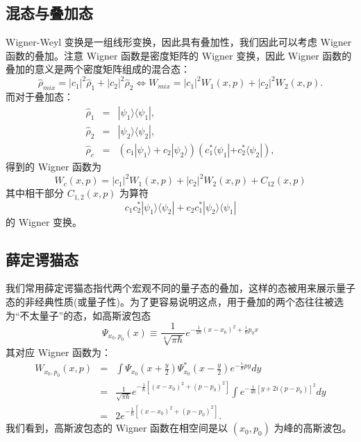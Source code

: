 \documentclass[10pt,UTF8]{ctexart}
\begin{document}
\subsection*{混态与叠加态}
\noindent
Wigner-Weyl 变换是一组线形变换，因此具有叠加性，我们因此可以考虑 Wigner 函数的叠加。注意 Wigner 函数是密度矩阵的 Wigner 变换，因此 Wigner 函数的叠加的意义是两个密度矩阵组成的混合态：
\begin{equation}
	\hat{\rho}_{mix} = |c_1|^2 \hat \rho_1 + |c_2|^2 \hat \rho_2 \Longleftrightarrow W_{mix} = |c_1|^2 W_1(x,p) + |c_2|^2 W_2(x,p).
\end{equation}
而对于叠加态：
\begin{eqnarray}
	\hat \rho_1 &=& |\psi_1\rangle \langle \psi_1|, \\
	\hat \rho_2 &=& |\psi_2\rangle \langle \psi_2|, \\
	\hat \rho_c &=& (c_1|\psi_1\rangle + c_2 |\psi_2\rangle) (c_1^*\langle \psi_1| + c_2^* \langle \psi_2|),
\end{eqnarray}
得到的 Wigner 函数为
\begin{equation}
	W_c(x,p) = |c_1|^2 W_1(x,p) + |c_2|^2 W_2(x,p) + C_{12}(x,p)
\end{equation}
其中相干部分 $C_{1,2}(x,p)$ 为算符
\begin{equation}
	c_1c_2^* |\psi_1 \rangle \langle \psi_2 | + c_2c_1^* |\psi_2 \rangle \langle \psi_1 |
\end{equation}
的 Wigner 变换。


\subsection*{薛定谔猫态}
\noindent
我们常用薛定谔猫态指代两个宏观不同的量子态的叠加，这样的态被用来展示量子态的非经典性质(或量子性)。为了更容易说明这点，用于叠加的两个态往往被选为“不太量子”的态，如高斯波包态
\begin{equation}
	\Psi_{x_0,p_0}(x) \equiv \frac{1}{\sqrt[4]{\pi \hbar}}e^{-\frac{1}{2 \hbar} (x-x_0)^2+\frac{i}{\hbar}p_0 x}
\end{equation}
其对应 Wigner 函数为：
\begin{eqnarray}
	W_{x_0,p_0}(x,p) &= & \int \Psi_{x_0}\left(x+\frac{y}{2}\right) \Psi^{*}_{x_0}\left(x-\frac{y}{2}\right)e^{-\frac{i}{\hbar}py}dy \nonumber \\
	&=& \frac{1}{\sqrt{\pi \hbar}}e^{-\frac{1}{\hbar}[(x-x_0)^2+(p-p_0)^2]}\int e^{-\frac{1}{4\hbar}[y+2i(p-p_0)]^2} dy \nonumber \\
	&=& 2 e^{-\frac{1}{\hbar}[(x-x_0)^2+(p-p_0)^2]}.
\end{eqnarray}
我们看到，高斯波包态的 Wigner 函数在相空间是以 $(x_0,p_0)$ 为峰的高斯波包。
\end{document}
